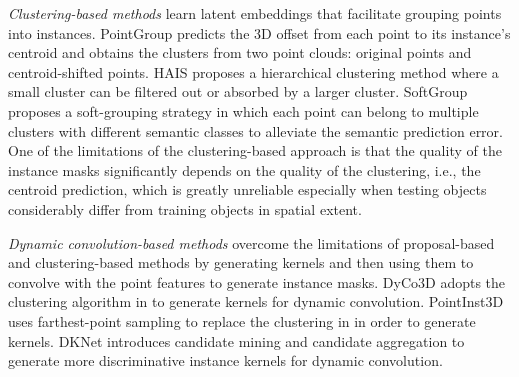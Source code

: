 \documentclass[10pt,twocolumn,letterpaper]{article}
\begin{document}
\textit{Clustering-based methods} \cite{wang2018sgpn,jiang2020pointgroup,chen2021hierarchical,he2021dyco3d,engelmann20203d,pham2019jsis3d,vu2022softgroup,zhao2022divide} learn latent embeddings that facilitate grouping points into instances. 
PointGroup \cite{jiang2020pointgroup} predicts the 3D offset from each point to its instance's centroid and obtains the clusters from two point clouds: original points and centroid-shifted points. 
HAIS \cite{chen2021hierarchical} proposes a hierarchical clustering method where a small cluster can be filtered out or absorbed by a larger cluster. 
SoftGroup \cite{vu2022softgroup} proposes a soft-grouping strategy in which each point can belong to multiple clusters with different semantic classes to alleviate the semantic prediction error. 
One of the limitations of the clustering-based approach is that the quality of the instance masks significantly depends on the quality of the clustering, i.e., the centroid prediction, which is greatly unreliable especially when testing objects considerably differ from training objects in spatial extent.

\textit{Dynamic convolution-based methods} \cite{he2021dyco3d,He2022PointInst3DS3,wu2022dknet} overcome the limitations of proposal-based and clustering-based methods by generating kernels and then using them to convolve with the point features to generate instance masks. 
DyCo3D \cite{he2021dyco3d} adopts the clustering algorithm in \cite{jiang2020pointgroup} to generate kernels for dynamic convolution. 
PointInst3D \cite{He2022PointInst3DS3} uses farthest-point sampling to replace the clustering in \cite{he2021dyco3d} in order to generate kernels.
DKNet \cite{wu2022dknet} introduces candidate mining and candidate aggregation to generate more discriminative instance kernels for dynamic convolution.
\end{document}
